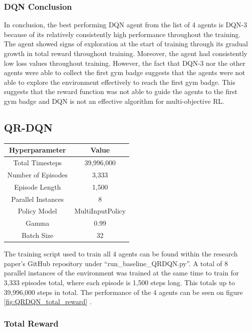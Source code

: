 \subsubsection*{DQN Conclusion}

In conclusion, the best performing DQN agent from the list of 4 agents is DQN-3 because of its relatively consistently high performance throughout the training. The agent showed signs of exploration at the start of training through its gradual growth in total reward throughout training. Moreover, the agent had consistently low loss values throughout training. However, the fact that DQN-3 nor the other agents were able to collect the first gym badge suggests that the agents were not able to explore the environment effectively to reach the first gym badge. This suggests that the reward function was not able to guide the agents to the first gym badge and DQN is not an effective algorithm for multi-objective RL.

\subsection{QR-DQN}

\begin{center}
    \begin{tabular}{ |c|c| } 
     \hline
     Hyperparameter & Value \\ 
     \hline
     Total Timesteps & 39,996,000 \\
     Number of Episodes &  3,333 \\
     Episode Length & 1,500 \\ 
     Parallel Instances & 8 \\
     Policy Model & MultiInputPolicy \\
     Gamma & 0.99 \\  
     Batch Size & 32 \\
     \hline
    \end{tabular}
    \end{center}

The training script used to train all 4 agents can be found within the research paper's GitHub repository under ``run\_baseline\_QRDQN.py''. A total of 8 parallel instances of the environment was trained at the same time to train for 3,333 episodes total, where each episode is 1,500 steps long. This totals up to 39,996,000 steps in total. The performance of the 4 agents can be seen on figure \ref{fig:QRDQN_total_reward} . 

\subsubsection*{Total Reward}

